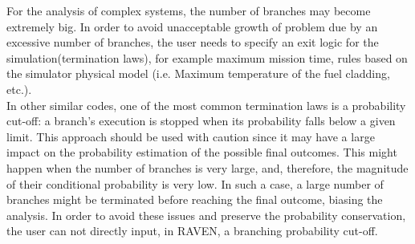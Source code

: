 For the analysis of complex systems, the number of branches may become extremely big. In order to avoid unacceptable growth of problem due by an excessive number of branches, the user needs to specify an exit logic for the simulation(termination laws), for example maximum mission time, rules based on the simulator physical model (i.e. Maximum temperature of the fuel cladding, etc.). 
\\In other similar codes, one of the most common termination laws is a probability cut-off: a branch's execution is stopped when its probability falls below a given limit. 
This approach should be used with caution since it may have a large impact on the probability estimation of the possible final outcomes. This might happen when the number of branches is very large, and, therefore, the magnitude of their conditional probability is very low. In such a case, a large number of branches might be terminated before reaching the final outcome, biasing the analysis.  In order to avoid these issues and preserve the probability conservation, the user can not directly input, in RAVEN, a branching probability cut-off. 

